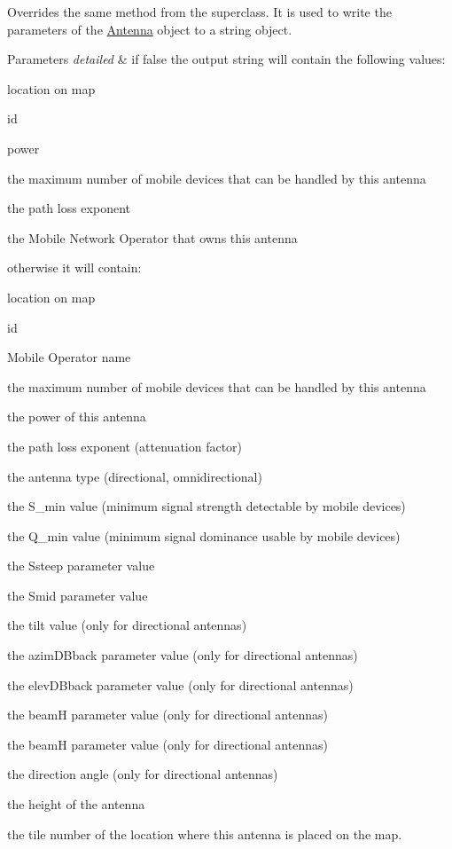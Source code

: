 Overrides the same method from the superclass. It is used to write the parameters of the \hyperlink{class_antenna}{Antenna} object to a string object. 
\begin{DoxyParams}{Parameters}
{\em detailed} & if false the output string will contain the following values\+: \begin{DoxyItemize}
\item location on map \item id \item power \item the maximum number of mobile devices that can be handled by this antenna \item the path loss exponent \item the Mobile Network Operator that owns this antenna\end{DoxyItemize}
otherwise it will contain\+: \begin{DoxyItemize}
\item location on map \item id \item Mobile Operator name \item the maximum number of mobile devices that can be handled by this antenna \item the power of this antenna \item the path loss exponent (attenuation factor) \item the antenna type (directional, omnidirectional) \item the S\+\_\+min value (minimum signal strength detectable by mobile devices) \item the Q\+\_\+min value (minimum signal dominance usable by mobile devices) \item the Ssteep parameter value \item the Smid parameter value \item the tilt value (only for directional antennas) \item the azim\+D\+Bback parameter value (only for directional antennas) \item the elev\+D\+Bback parameter value (only for directional antennas) \item the beamH parameter value (only for directional antennas) \item the beamH parameter value (only for directional antennas) \item the direction angle (only for directional antennas) \item the height of the antenna \item the tile number of the location where this antenna is placed on the map.\end{DoxyItemize}
\\
\hline
\end{DoxyParams}
